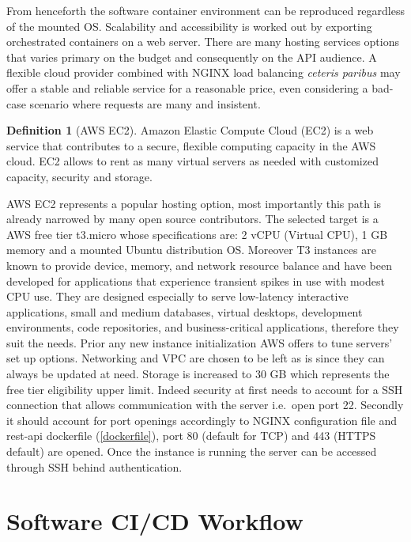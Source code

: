 \documentclass[
  12pt,
  a4paper,
  oneside]{book}
\theoremstyle{definition}
\newtheorem{definition}{Definition}[chapter]
\theoremstyle{definition}
\theoremstyle{definition}
\theoremstyle{remark}
\begin{document}
From henceforth the software container environment can be reproduced regardless of the mounted OS. Scalability and accessibility is worked out by exporting orchestrated containers on a web server. There are many hosting services options that varies primary on the budget and consequently on the API audience. A flexible cloud provider combined with NGINX load balancing \emph{ceteris paribus} may offer a stable and reliable service for a reasonable price, even considering a bad-case scenario where requests are many and insistent.
\begin{definition}[AWS EC2]
\protect\hypertarget{def:aws}{}{\label{def:aws} {} }Amazon Elastic Compute Cloud (EC2) is a web service that contributes to a secure, flexible computing capacity in the AWS cloud. EC2 allows to rent as many virtual servers as needed with customized capacity, security and storage.
\end{definition}

AWS EC2 represents a popular hosting option, most importantly this path is already narrowed by many open source contributors. The selected target is a AWS free tier t3.micro whose specifications are: 2 vCPU (Virtual CPU), 1 GB memory and a mounted Ubuntu distribution OS. Moreover T3 instances are known to provide device, memory, and network resource balance and have been developed for applications that experience transient spikes in use with modest CPU use. They are designed especially to serve low-latency interactive applications, small and medium databases, virtual desktops, development environments, code repositories, and business-critical applications, therefore they suit the needs.
Prior any new instance initialization AWS offers to tune servers' set up options. Networking and VPC are chosen to be left as is since they can always be updated at need. Storage is increased to 30 GB which represents the free tier eligibility upper limit. Indeed security at first needs to account for a SSH connection that allows communication with the server i.e.~open port 22. Secondly it should account for port openings accordingly to NGINX configuration file and rest-api dockerfile (\ref{dockerfile}), port 80 (default for TCP) and 443 (HTTPS default) are opened. Once the instance is running the server can be accessed through SSH behind authentication.

\hypertarget{sdwf}{%
\section{Software CI/CD Workflow}\label{sdwf}}
\end{document}
